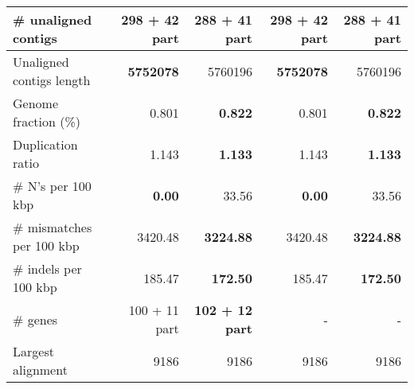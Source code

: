 \documentclass[12pt,a4paper]{article}
\begin{document}
\begin{table}[ht]
\begin{center}
\begin{tabular}{|l*{4}{|r}|}
\# unaligned contigs & 298 + 42 part & {\bf 288 + 41 part} & 298 + 42 part & {\bf 288 + 41 part} \\ \hline
Unaligned contigs length & {\bf 5752078} & 5760196 & {\bf 5752078} & 5760196 \\ \hline
Genome fraction (\%) & 0.801 & {\bf 0.822} & 0.801 & {\bf 0.822} \\ \hline
Duplication ratio & 1.143 & {\bf 1.133} & 1.143 & {\bf 1.133} \\ \hline
\# N's per 100 kbp & {\bf 0.00} & 33.56 & {\bf 0.00} & 33.56 \\ \hline
\# mismatches per 100 kbp & 3420.48 & {\bf 3224.88} & 3420.48 & {\bf 3224.88} \\ \hline
\# indels per 100 kbp & 185.47 & {\bf 172.50} & 185.47 & {\bf 172.50} \\ \hline
\# genes & 100 + 11 part & {\bf 102 + 12 part} & - & - \\ \hline
Largest alignment & 9186 & 9186 & 9186 & 9186 \\ \hline
\end{tabular}
\end{center}
\end{table}
\end{document}
